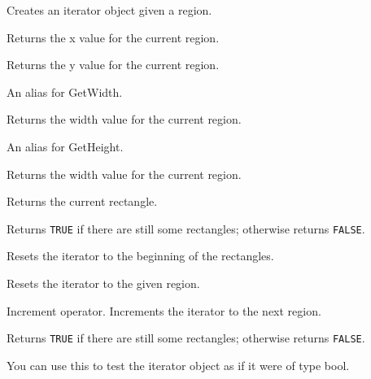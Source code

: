 Creates an iterator object given a region.



Returns the x value for the current region.



Returns the y value for the current region.



An alias for GetWidth.



Returns the width value for the current region.



An alias for GetHeight.



Returns the width value for the current region.



Returns the current rectangle.



Returns {\tt TRUE} if there are still some rectangles; otherwise returns {\tt FALSE}.



Resets the iterator to the beginning of the rectangles.


Resets the iterator to the given region.



Increment operator. Increments the iterator to the next region.




Returns {\tt TRUE} if there are still some rectangles; otherwise returns {\tt FALSE}.

You can use this to test the iterator object as if it were of type bool.


